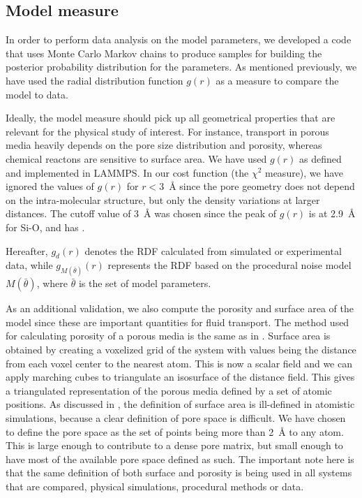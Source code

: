 \documentclass[aps,pre,twocolumn,letterpaper,floatfix,showpacs]{revtex4}
\begin{document}
\subsection{Model measure}
In order to perform data analysis on the model parameters, we developed a code that
uses Monte Carlo Markov chains to produce samples for building the posterior probability distribution for the parameters. 
As mentioned previously, we have used the radial distribution function $g(r)$ as a measure to compare the model to data.

Ideally, the model measure should pick up all geometrical properties that are
relevant for the physical study of interest. 
For instance, transport in porous media heavily depends on the pore size distribution and porosity\cite{kozeny1927uber, carman1937fluid},
whereas chemical reactons are sensitive to surface area\cite{coussy2011mechanics}. We have used $g(r)$ as defined and implemented in LAMMPS\cite{plimpton1995fast}.
In our cost function (the $\chi^2$ measure), we have ignored the values of $g(r)$ for $r<$\SI{3}{\angstrom} since the pore geometry does not depend on the intra-molecular structure, but only the density variations at larger distances.
The cutoff value of \SI{3}{\angstrom} was chosen since the peak of $g(r)$ is at \SI{2.9}{\angstrom} for Si-O\cite{vashishta1990interaction}, and has .

Hereafter, $g_d(r)$ denotes the RDF calculated from simulated or experimental data,
while $g_{M(\bar \theta)}(r)$ represents the RDF based on the procedural noise
model $M(\bar \theta)$, where $\bar \theta$ is the set of model parameters. 

As an additional validation, we also compute the porosity and surface area of the model since these are important quantities for fluid transport.
The method used for calculating porosity of a porous media is the same as in \cite{gelb1998characterization}.
Surface area is obtained by creating a voxelized grid of the system with values being the distance from each voxel center to the nearest atom.
This is now a scalar field and we can apply marching cubes\cite{lorensen1987marching} to triangulate an isosurface of the distance field.
This gives a triangulated representation of the porous media defined by a set of atomic positions.
As discussed in \cite{gelb1998characterization}, the definition of surface area is ill-defined in
atomistic simulations, because a clear definition of pore space is difficult.
We have chosen to define the pore space as the set of points being more than \SI{2}{\angstrom} to any atom.
This is large enough to contribute to a dense pore matrix, but small enough to have most of the available pore space defined as such. 
The important note here is that the same definition of both surface and porosity is being used in all systems that are compared, physical simulations, procedural methods or data. 
\end{document}
